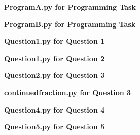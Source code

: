 \pagebreak
\textbf{Program\textunderscore A.py for Programming Task}\centering\label{Program_A}

\vspace{2cm}

\pagebreak
\textbf{Program\textunderscore B.py for Programming Task}\centering\label{Program_B}

\vspace{2cm}

\pagebreak
\textbf{Question\textunderscore 1.py for Question 1}\centering\label{Question_1}

\vspace{2cm}

\pagebreak
\textbf{Question\textunderscore 1.py for Question 2}\centering\label{Question_2}

\vspace{2cm}

\pagebreak
\textbf{Question\textunderscore 2.py for Question 3}\centering\label{Question_3}

\vspace{2cm}

\pagebreak
\textbf{continued\textunderscore fraction.py for Question 3}\centering\label{continued_fraction}

\vspace{2cm}

\pagebreak
\textbf{Question\textunderscore 4.py for Question 4}\centering\label{Question_4}

\vspace{2cm}

\pagebreak
\textbf{Question\textunderscore 5.py for Question 5}\centering\label{Question_5}

\vspace{2cm}